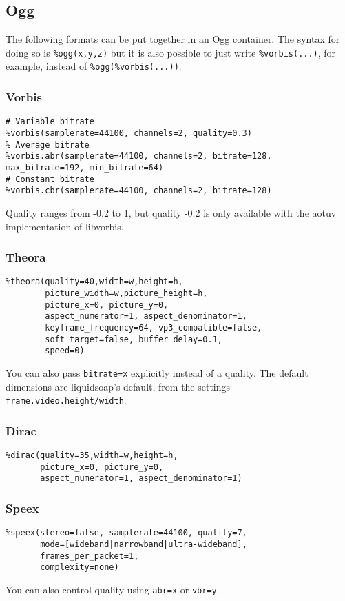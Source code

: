 \subsection{Ogg}
The following formats can be put together in an Ogg container.
The syntax for doing so is \verb+%ogg(x,y,z)+ but it is also
possible to just write \verb+%vorbis(...)+, for example, instead
of \verb+%ogg(%vorbis(...))+.

\subsubsection{Vorbis}
\begin{verbatim}
# Variable bitrate
%vorbis(samplerate=44100, channels=2, quality=0.3)
% Average bitrate
%vorbis.abr(samplerate=44100, channels=2, bitrate=128, max_bitrate=192, min_bitrate=64)
# Constant bitrate
%vorbis.cbr(samplerate=44100, channels=2, bitrate=128)
\end{verbatim}
Quality ranges from -0.2 to 1,
but quality -0.2 is only available with the aotuv implementation of libvorbis.

\subsubsection{Theora}
\begin{verbatim}
%theora(quality=40,width=w,height=h,
        picture_width=w,picture_height=h,
        picture_x=0, picture_y=0,
        aspect_numerator=1, aspect_denominator=1,
        keyframe_frequency=64, vp3_compatible=false,
        soft_target=false, buffer_delay=0.1,
        speed=0)
\end{verbatim}
You can also pass \verb+bitrate=x+ explicitly instead of a quality.
The default dimensions are liquidsoap's default,
from the settings \verb+frame.video.height/width+.

\subsubsection{Dirac}
\begin{verbatim}
%dirac(quality=35,width=w,height=h,
       picture_x=0, picture_y=0,
       aspect_numerator=1, aspect_denominator=1)
\end{verbatim}
\subsubsection{Speex}
\begin{verbatim}
%speex(stereo=false, samplerate=44100, quality=7,
       mode=[wideband|narrowband|ultra-wideband],
       frames_per_packet=1,
       complexity=none)
\end{verbatim}
You can also control quality using \verb+abr=x+ or \verb+vbr=y+.

